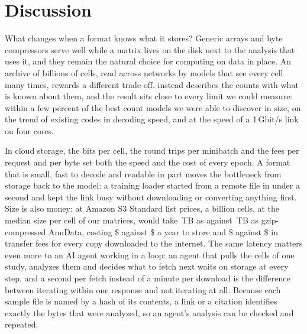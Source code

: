 \section{Discussion}
\label{sec:discussion}

What changes when a format knows what it stores? Generic arrays and byte compressors serve well while a matrix lives on
the disk next to the analysis that uses it, and they remain the natural choice for computing on data in place. An archive
of billions of cells, read across networks by models that see every cell many times, rewards a different trade-off. \sone{} instead describes the counts with what is known about
them, and the result sits close to every limit we could measure: within a few percent of the best count models we were able to discover
in size, on the trend of existing codes in decoding speed, and at the speed of a 1\,Gbit/s link on four cores.

In cloud storage, the bits per cell, the round trips per minibatch and the fees per request and per byte set both the speed
and the cost of every epoch. A format that is small, fast to decode and readable in part moves the bottleneck from storage
back to the model: a training loader started from a remote \sone{} file in under a second and kept the link busy without
downloading or converting anything first. Size is also money: at Amazon S3 Standard list prices, a billion cells, at the median size per cell
of our matrices, would take \,TB as \sone{} against \,TB as gzip-compressed AnnData, costing
\$ against \$ a year to store and \$ against \$ in
transfer fees for every copy downloaded to the internet. The same latency matters even more to an AI agent working in a loop: an
agent that pulls the cells of one study, analyzes them and decides what to fetch next waits on storage at every step, and a
second per fetch instead of a minute per download is the difference between iterating within one response and not
iterating at all. Because each sample file is named by a hash of its contents, a link or a citation identifies exactly the
bytes that were analyzed, so an agent's analysis can be checked and repeated.


